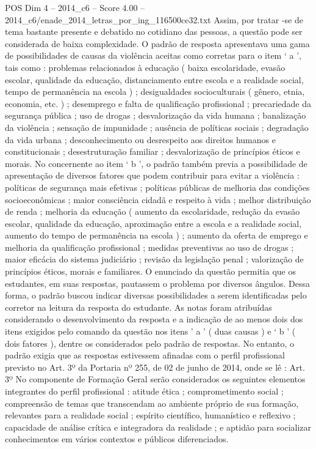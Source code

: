 \begin{textsample}{POS Dim 4 – 2014\_c6 – Score 4.00 – 2014\_c6/enade\_2014\_letras\_por\_ing\_116500ce32.txt}
Assim, por tratar -se de tema bastante presente e debatido no cotidiano das pessoas, a questão pode ser considerada de baixa complexidade.
O padrão de resposta apresentava uma gama de possibilidades de causas da violência aceitas como corretas para o item ‘ a ’, tais como : problemas relacionados à educação ( baixa escolaridade, evasão escolar, qualidade da educação, distanciamento entre escola e a realidade social, tempo de permanência na escola ) ; desigualdades socioculturais ( gênero, etnia, economia, etc. ) ; desemprego e falta de qualificação profissional ; precariedade da segurança pública ; uso de drogas ; desvalorização da vida humana ; banalização da violência ; sensação de impunidade ; ausência de políticas sociais ; degradação da vida urbana ; desconhecimento ou desrespeito aos direitos humanos e constitucionais ; desestruturação familiar ; desvalorização de princípios éticos e morais.
No concernente ao item ‘ b ’, o padrão também previa a possibilidade de apresentação de diversos fatores que podem contribuir para evitar a violência : políticas de segurança mais efetivas ; políticas públicas de melhoria das condições socioeconômicas ; maior consciência cidadã e respeito à vida ; melhor distribuição de renda ; melhoria da educação ( aumento da escolaridade, redução da evasão escolar, qualidade da educação, aproximação entre a escola e a realidade social, aumento do tempo de permanência na escola ) ; aumento da oferta de emprego e melhoria da qualificação profissional ; medidas preventivas ao uso de drogas ; maior eficácia do sistema judiciário ; revisão da legislação penal ; valorização de princípios éticos, morais e familiares.
O enunciado da questão permitia que os estudantes, em suas respostas, pautassem o problema por diversos ângulos.
Dessa forma, o padrão buscou indicar diversas possibilidades a serem identificadas pelo corretor na leitura da resposta do estudante.
As notas foram atribuídas considerando o desenvolvimento da resposta e a indicação de ao menos dois dos itens exigidos pelo comando da questão nos itens ’ a ’ ( duas causas ) e ‘ b ’ ( dois fatores ), dentre os considerados pelo padrão de respostas.
No entanto, o padrão exigia que as respostas estivessem afinadas com o perfil profissional previsto no Art. 3º da Portaria nº 255, de 02 de junho de 2014, onde se lê : Art. 3º No componente de Formação Geral serão considerados os seguintes elementos integrantes do perfil profissional : atitude ética ; comprometimento social ; compreensão de temas que transcendam ao ambiente próprio de sua formação, relevantes para a realidade social ; espírito científico, humanístico e reflexivo ; capacidade de análise crítica e integradora da realidade ; e aptidão para socializar conhecimentos em vários contextos e públicos diferenciados.

\end{textsample}
